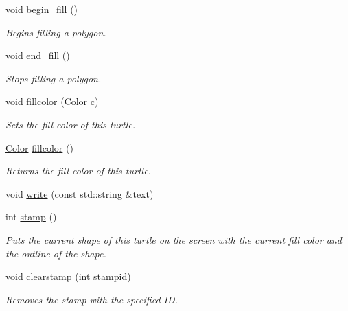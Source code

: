 \begin{DoxyCompactItemize}
void \hyperlink{classcturtle_1_1Turtle_a5d441494084c38e8947205a19f70ce73}{begin\+\_\+fill} ()
\begin{DoxyCompactList}\small\item\em Begins filling a polygon. \end{DoxyCompactList}\item 
void \hyperlink{classcturtle_1_1Turtle_aaf0576f0492ba3c4b1afa5bea50b9ddb}{end\+\_\+fill} ()
\begin{DoxyCompactList}\small\item\em Stops filling a polygon. \end{DoxyCompactList}\item 
void \hyperlink{classcturtle_1_1Turtle_a222a95d61c5cfee661f5244e51d57539}{fillcolor} (\hyperlink{classcturtle_1_1Color}{Color} c)
\begin{DoxyCompactList}\small\item\em Sets the fill color of this turtle. \end{DoxyCompactList}\item 
\hyperlink{classcturtle_1_1Color}{Color} \hyperlink{classcturtle_1_1Turtle_aa35fb43f969187b513d5a1f443e98569}{fillcolor} ()
\begin{DoxyCompactList}\small\item\em Returns the fill color of this turtle. \end{DoxyCompactList}\item 
void \hyperlink{classcturtle_1_1Turtle_a6e814845ac619a90aeee25a67a3fc51d}{write} (const std\+::string \&text)
\item 
int \hyperlink{classcturtle_1_1Turtle_af7b7e9c43e22fabce3a5435d09c73f77}{stamp} ()
\begin{DoxyCompactList}\small\item\em Puts the current shape of this turtle on the screen with the current fill color and the outline of the shape. \end{DoxyCompactList}\item 
\mbox{\label{classcturtle_1_1Turtle_a9e1dea0d65c8cc1e4627e28b20390eb2}} 
void \hyperlink{classcturtle_1_1Turtle_a9e1dea0d65c8cc1e4627e28b20390eb2}{clearstamp} (int stampid)
\begin{DoxyCompactList}\small\item\em Removes the stamp with the specified ID. \end{DoxyCompactList}\item 
\mbox{\label{classcturtle_1_1Turtle_a92d143232f35dd3ff64af3236182442d}} 

\end{DoxyCompactItemize}
